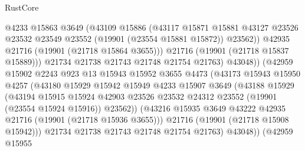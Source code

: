 \begin{lexlean}{RustCore}
\begin{coremodule}
                              @4233
                              @15863
                              @3649
                              (@43109
                                @15886
                                (@43117
                                  @15871
                                  @15881
                                  @43127
                                  @23526
                                  @23532
                                  @23549
                                  @23552
                                  (@19901 (@23554 @15881 @15872))
                                  @23562))
                              @42935
                              @21716
                              (@19901 (@21718 @15864 @3655)))
                            @21716
                            (@19901 (@21718 @15837 @15889)))
                          @21734
                          @21738
                          @21743
                          @21748
                          @21754
                          @21763)
                        @43048))
                    (@42959
                      @15902
                      @2243
                      @923
                      @13
                      @15943
                      @15952
                      @3655
                      @4473
                      (@43173
                        @15943
                        @15950
                        @4257
                        (@43180
                          @15929
                          @15942
                          @15949
                          @4233
                          @15907
                          @3649
                          (@43188
                            @15929
                            (@43194
                              @15915
                              @15924
                              @42903
                              @23526
                              @23532
                              @24312
                              @23552
                              (@19901 (@23554 @15924 @15916))
                              @23562))
                          (@43216 @15935 @3649 @43222 @42935 @21716 (@19901 (@21718 @15936 @3655)))
                          @21716
                          (@19901 (@21718 @15908 @15942)))
                        @21734
                        @21738
                        @21743
                        @21748
                        @21754
                        @21763)
                      @43048))
                  (@42959
                    @15955

\end{coremodule}
\end{lexlean}
